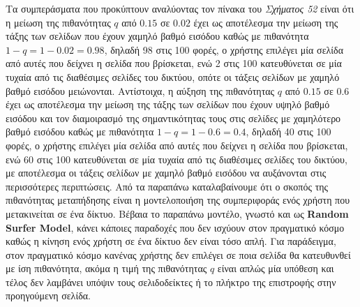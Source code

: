 \documentclass[First Project.tex]{subfiles}
\begin{document}
Τα συμπεράσματα που προκύπτουν αναλύοντας τον πίνακα του \textit{Σχήματος 52} είναι ότι η μείωση της πιθανότητας $q$ από $0.15$ σε $0.02$   
έχει ως αποτέλεσμα την μείωση της τάξης των σελίδων που έχουν χαμηλό βαθμό εισόδου καθώς με πιθανότητα $1-q = 1-0.02 = 0.98$, δηλαδή 98 στις
100 φορές, ο χρήστης επιλέγει μία σελίδα από αυτές που δείχνει η σελίδα που βρίσκεται, ενώ 2 στις 100 κατευθύνεται σε μία τυχαία από τις
διαθέσιμες σελίδες του δικτύου, οπότε οι τάξεις σελίδων με χαμηλό βαθμό εισόδου μειώνονται. Αντίστοιχα, η αύξηση της πιθανότητας $q$ από $0.15$ σε $0.6$ 
έχει ως αποτέλεσμα την μείωση της τάξης των σελίδων που έχουν υψηλό βαθμό εισόδου και τον διαμοιρασμό της σημαντικότητας τους στις σελίδες
με χαμηλότερο βαθμό εισόδου καθώς με πιθανότητα $1-q = 1-0.6 = 0.4$, δηλαδή 40 στις 100 φορές, ο χρήστης επιλέγει μία σελίδα από αυτές που
δείχνει	η σελίδα που βρίσκεται, ενώ 60 στις 100 κατευθύνεται σε μία τυχαία από τις διαθέσιμες σελίδες του δικτύου, με αποτέλεσμα οι τάξεις 
σελίδων με χαμηλό βαθμό εισόδου να αυξάνονται στις περισσότερες περιπτώσεις. Από τα παραπάνω καταλαβαίνουμε ότι ο σκοπός της πιθανότητας 
μεταπήδησης είναι η μοντελοποιήση της συμπεριφοράς ενός χρήστη που μετακινείται σε ένα δίκτυο. Βέβαια το παραπάνω μοντέλο, γνωστό και ως 
\textlatin{\textbf{Random Surfer Model}}, κάνει κάποιες παραδοχές που δεν ισχύουν στον πραγματικό κόσμο καθώς η κίνηση ενός χρήστη σε ένα 
δίκτυο δεν είναι τόσο απλή. Για παράδειγμα, στον πραγματικό κόσμο κανένας χρήστης δεν επιλέγει σε ποια σελίδα θα κατευθυνθεί με ίση 
πιθανότητα, ακόμα η τιμή της πιθανότητας $q$ είναι απλώς μία υπόθεση και τέλος δεν λαμβάνει υπόψιν τους σελιδοδείκτες ή το πλήκτρο της 
επιστροφής στην προηγούμενη σελίδα.
\end{document}
